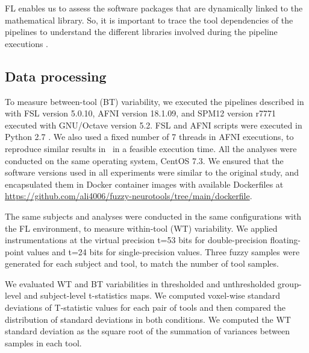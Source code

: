 \documentclass[conference]{IEEEtran}
\begin{document}
FL enables us to assess the software packages that are dynamically linked to the mathematical library.
So, it is important to trace the tool dependencies of the pipelines to understand the different libraries
involved during the pipeline executions .
\subsection{Data processing}

To measure between-tool (BT) variability, we executed the pipelines described in~\cite{bowring2019exploring}
with FSL version 5.0.10, AFNI version 18.1.09, and SPM12 version r7771
executed with GNU/Octave version 5.2.  
FSL and AFNI scripts were executed in Python 2.7 . We also used a fixed number of 7 threads in AFNI executions,
to reproduce similar results in~\cite{bowring2019exploring} in a feasible execution time.
All the analyses were conducted on the same operating system, CentOS 7.3.
We ensured that the software versions  used in all experiments were similar to the original study,
and encapsulated them in Docker container images with available Dockerfiles at \url{https://github.com/ali4006/fuzzy-neurotools/tree/main/dockerfile}.

The same subjects and analyses were conducted in the same configurations
with the FL environment, to measure within-tool (WT) variability. We
applied instrumentations at the virtual precision t=53 bits for
double-precision floating-point values and t=24 bits for single-precision
values. Three fuzzy samples were generated for each subject and tool, to
match the number of tool samples. 

We evaluated WT and BT variabilities in thresholded and unthresholded group-level and subject-level t-statistics maps.
We computed voxel-wise standard deviations of T-statistic values for each pair of tools
and then compared the distribution of  standard deviations in both conditions.
We computed the WT standard deviation as the square root of the summation of variances between samples in each tool. 
\end{document}
